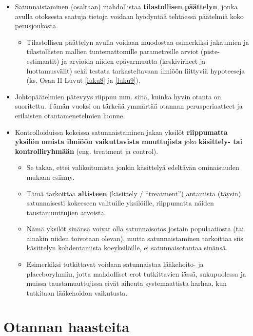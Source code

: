 \documentclass[
]{book}
\providecommand{\tightlist}{%
  \setlength{\itemsep}{0pt}\setlength{\parskip}{0pt}}
\begin{document}
\begin{itemize}
\item
  Satunnaistaminen (osaltaan) mahdollistaa \textbf{tilastollisen päättelyn}, jonka avulla otoksesta saatuja tietoja voidaan hyödyntää tehtäessä päätelmiä koko perusjoukosta.

  \begin{itemize}
  \tightlist
  \item
    Tilastollisen päättelyn avulla voidaan muodostaa esimerkiksi jakaumien ja tilastollisten mallien tuntemattomille parametreille arviot (piste-estimaatit) ja arvioida niiden epävarmuutta (keskivirheet ja luottamusvälit) sekä testata tarkasteltavaan ilmiöön liittyviä hypoteeseja (ks. Osan II Luvut \ref{luku8} ja \ref{luku9}).
  \end{itemize}
\item
  Johtopäätelmien pätevyys riippuu mm. siitä, kuinka hyvin otanta on suoritettu. Tämän vuoksi on tärkeää ymmärtää otannan perusperiaatteet ja erilaisten otantamenetelmien luonne.
\item
  Kontrolloiduissa kokeissa satunnaistaminen jakaa yksilöt \textbf{riippumatta yksilön omista ilmiöön vaikuttavista muuttujista} joko \textbf{käsittely- tai kontrolliryhmään} (eng. treatment ja control).

  \begin{itemize}
  \tightlist
  \item
    Se takaa, ettei valikoitumista jonkin käsittelyä edeltävän ominaisuuden mukaan esiinny.
  \item
    Tämä tarkoittaa \textbf{altisteen} (käsittely / ``treatment'') antamista (täysin) satunnaisesti kokeeseen valituille yksilöille, riippumatta näiden taustamuuttujien arvoista.
  \item
    Nämä yksilöt sinänsä voivat olla satunnaisotos jostain populaatiosta (tai ainakin niiden toivotaan olevan), mutta satunnaistaminen tarkoittaa siis käsittelyn kohdentamista koeyksilöille, ei satunnaisotantaa sinänsä.
  \item
    Esimerkiksi tutkittavat voidaan satunnaistaa lääkehoito- ja placeboryhmiin, jotta mahdolliset erot tutkittavien iässä, sukupuolessa ja muissa taustamuuttujissa eivät aiheuta systemaattista harhaa, kun tutkitaan lääkehoidon vaikutusta.
  \end{itemize}
\end{itemize}

\hypertarget{alaluku55}{%
\section{Otannan haasteita}\label{alaluku55}}
\end{document}
